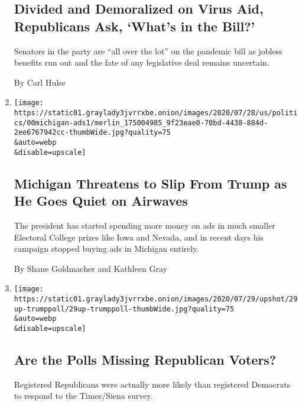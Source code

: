 \begin{enumerate}
  \hypertarget{divided-and-demoralized-on-virus-aid-republicans-ask-whats-in-the-bill}{%
  \subsection{Divided and Demoralized on Virus Aid, Republicans Ask,
  `What's in the
  Bill?'}\label{divided-and-demoralized-on-virus-aid-republicans-ask-whats-in-the-bill}}

  Senators in the party are ``all over the lot'' on the pandemic bill as
  jobless benefits run out and the fate of any legislative deal remains
  uncertain.

  By Carl Hulse
\item
  \href{/2020/07/29/us/politics/michigan-trump-biden-2020.html}{}

  \texttt{[image: https://static01.graylady3jvrrxbe.onion/images/2020/07/28/us/politics/00michigan-ads1/merlin\_175004985\_9f23eae0-70bd-4438-884d-2ee6767942cc-thumbWide.jpg?quality=75\\\&auto=webp\\\&disable=upscale]}

  \hypertarget{michigan-threatens-to-slip-from-trump-as-he-goes-quiet-on-airwaves-1}{%
  \subsection{Michigan Threatens to Slip From Trump as He Goes Quiet on
  Airwaves}\label{michigan-threatens-to-slip-from-trump-as-he-goes-quiet-on-airwaves-1}}

  The president has started spending more money on ads in much smaller
  Electoral College prizes like Iowa and Nevada, and in recent days his
  campaign stopped buying ads in Michigan entirely.

  By Shane Goldmacher and Kathleen Gray
\item
  \href{/2020/07/29/upshot/polls-political-party-republicans.html}{}

  \texttt{[image: https://static01.graylady3jvrrxbe.onion/images/2020/07/29/upshot/29up-trumppoll/29up-trumppoll-thumbWide.jpg?quality=75\\\&auto=webp\\\&disable=upscale]}

  \hypertarget{are-the-polls-missing-republican-voters}{%
  \subsection{Are the Polls Missing Republican
  Voters?}\label{are-the-polls-missing-republican-voters}}

  Registered Republicans were actually more likely than registered
  Democrats to respond to the Times/Siena survey.


\end{enumerate}
